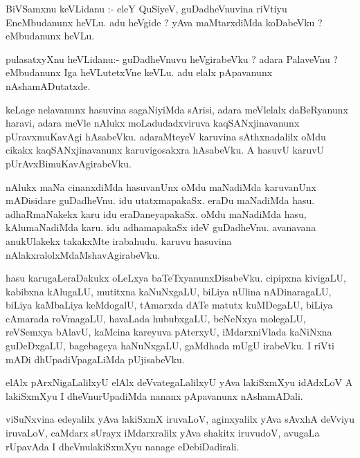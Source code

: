 \documentclass{article}
\begin{document}
\begin{mn}
BiVSamxnu  keVLidanu :- eleY  QuSiyeV,  guDadheVnuvina  riVtiyu  EneMbudanunx  
heVLu.  adu  heVgide ?  yAva  maMtarxdiMda  koDabeVku ?  eMbudanunx  heVLu.
\end{mn}

\begin{mn}
pulasatxyXnu  heVLidanu:-  guDadheVnuvu  heVgirabeVku ?  adara  PalaveVnu ?  
eMbudanunx  Iga  heVLutetxVne  keVLu.  adu  elalx  pApavanunx  nAshamADutatxde.
\end{mn}

\begin{mn}
keLage  nelavanunx  hasuvina  sagaNiyiMda  sArisi,  adara  meVlelalx  daBeRyanunx  
haravi,  adara  meVle  nAlukx  moLadudadxviruva  kaqSANxjinavanunx  pUravxmuKavAgi  
hAsabeVku.  adaraMteyeV  karuvina  sAthxnadalilx  oMdu  cikakx  kaqSANxjinavanunx  
karuvigosakxra  hAsabeVku.  A  hasuvU  karuvU  pUrAvxBimuKavAgirabeVku.
\end{mn}

\begin{mn}
nAlukx  maNa  cinanxdiMda hasuvanUnx  oMdu  maNadiMda  karuvanUnx  mADisidare  guDadheVnu.  
idu  utatxmapakaSx.  eraDu  maNadiMda  hasu.  adhaRmaNakekx  karu  idu  eraDaneyapakaSx.  
oMdu  maNadiMda  hasu,  kAlumaNadiMda  karu.  idu  adhamapakaSx  ideV  guDadheVnu.  
avanavana  anukUlakekx  takakxMte  irabahudu.  karuvu  hasuvina  nAlakxralolxMdaMshavAgirabeVku.
\end{mn}

\begin{mn}
hasu  karugaLeraDakukx  oLeLxya  baTeTxyanunxDisabeVku.  cipipxna  kivigaLU,  kabibxna  
kAlugaLU,  mutitxna  kaNuNxgaLU,  biLiya  nUlina nADinaragaLU,  biLiya  kaMbaLiya  keMdogalU,  
tAmarxda  dATe  matutx  kuMDegaLU,  biLiya  cAmarada  roVmagaLU,  havaLada  hububxgaLU,  
beNeNxya  molegaLU,  reVSemxya  bAlavU,  kaMcina  kareyuva  pAterxyU,  iMdarxniVlada  
kaNiNxna  guDeDxgaLU,  bagebageya  haNuNxgaLU,  gaMdhada  mUgU  irabeVku.  I riVti  mADi  
dhUpadiVpagaLiMda  pUjisabeVku.
\end{mn}

\begin{mn}
elAlx  pArxNigaLalilxyU  elAlx  deVvategaLalilxyU  yAva  lakiSxmXyu  idAdxLoV  A  
lakiSxmXyu  I  dheVnurUpadiMda  nananx  pApavanunx  nAshamADali.
\end{mn}

\begin{mn}
viSuNxvina  edeyalilx  yAva  lakiSxmX  iruvaLoV,  aginxyalilx  yAva  sAvxhA  deVviyu  
iruvaLoV,  caMdarx  sUrayx  iMdarxralilx  yAva  shakitx  iruvudoV,  avugaLa  rUpavAda  
I  dheVnulakiSxmXyu  nanage  eDebiDadirali.
\end{mn}
\end{document}
